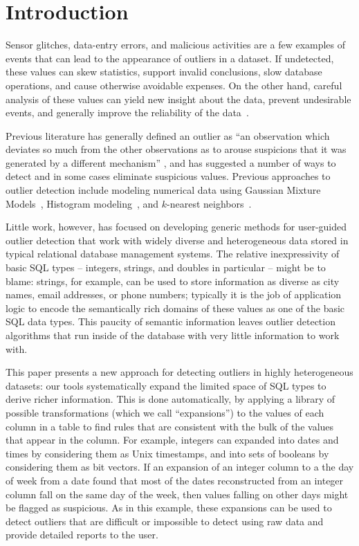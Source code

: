 \section{Introduction}
\label{sec:intro}

Sensor glitches, data-entry errors, and malicious activities are a few examples of events that can lead to the appearance of outliers in a dataset. If undetected, these values can skew statistics, support invalid conclusions, slow database operations, and cause otherwise avoidable expenses. On the other hand, careful analysis of these values can yield new insight about the data, prevent undesirable events, and generally improve the reliability of the data~\cite{Achour2014}.

Previous literature has generally defined an outlier as ``an observation which deviates so much from the other observations as to arouse suspicions that it was generated by a different mechanism'' \cite{Hawkins1980}, and has suggested a number of ways to detect and in some cases eliminate suspicious values. Previous approaches to outlier detection include modeling numerical data using Gaussian Mixture Models~\cite{Lu2005,Roberts1994,Roberts1999}, Histogram modeling~\cite{Gebski2007,Sheng2007}, and $k$-nearest neighbors~\cite{Ramaswamy2000}.

Little work, however, has focused on developing generic methods for user-guided outlier detection that work with widely diverse and heterogeneous data stored in typical relational database management systems. The relative inexpressivity of basic SQL types -- integers, strings, and doubles in particular -- might be to blame: strings, for example, can be used to store information as diverse as city names, email addresses, or phone numbers; typically it is the job of application logic to encode the semantically rich domains of these values as one of the basic SQL data types. This paucity of semantic information leaves outlier detection algorithms that run inside of the database with very little information to work with.

This paper presents a new approach for detecting outliers in highly heterogeneous datasets: our tools systematically expand the limited space of SQL types to derive richer information.
This is done automatically, by applying a library of possible transformations (which we call ``expansions'') to the values of each column in a table to find rules that are consistent with the bulk of the values that appear in the column.
For example, integers can expanded into dates and times by considering them as Unix timestamps, and into sets of booleans by considering them as bit vectors.
If an expansion of an integer column to a the day of week from a date found that most of the dates reconstructed from an integer column fall on the same day of the week, then values falling on other days might be flagged as suspicious.
As in this example, these expansions  can be used to detect outliers that are difficult or impossible to detect using raw data and provide detailed reports to the user.

